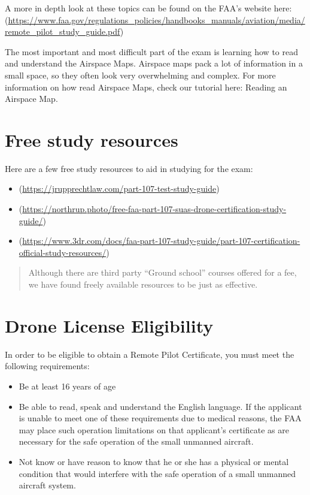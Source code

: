 \documentclass[
]{book}
\providecommand{\tightlist}{%
  \setlength{\itemsep}{0pt}\setlength{\parskip}{0pt}}
\begin{document}
A more in depth look at these topics can be found on the FAA's website here: (\url{https://www.faa.gov/regulations_policies/handbooks_manuals/aviation/media/remote_pilot_study_guide.pdf})

The most important and most difficult part of the exam is learning how to read and understand the Airspace Maps. Airspace maps pack a lot of information in a small space, so they often look very overwhelming and complex. For more information on how read Airspace Maps, check our tutorial here: Reading an Airspace Map.

\hypertarget{free-study-resources}{%
\section{Free study resources}\label{free-study-resources}}

Here are a few free study resources to aid in studying for the exam:

\begin{itemize}
\tightlist
\item
  (\url{https://jrupprechtlaw.com/part-107-test-study-guide})
\item
  (\url{https://northrup.photo/free-faa-part-107-suas-drone-certification-study-guide/})
\item
  (\url{https://www.3dr.com/docs/faa-part-107-study-guide/part-107-certification-official-study-resources/})
\end{itemize}

\begin{quote}
Although there are third party ``Ground school'' courses offered for a fee, we have found freely available resources to be just as effective.
\end{quote}

\hypertarget{drone-license-eligibility}{%
\section{Drone License Eligibility}\label{drone-license-eligibility}}

In order to be eligible to obtain a Remote Pilot Certificate, you must meet the following requirements:

\begin{itemize}
\tightlist
\item
  Be at least 16 years of age
\item
  Be able to read, speak and understand the English language. If the applicant is unable to meet one of these requirements due to medical reasons, the FAA may place such operation limitations on that applicant's certificate as are necessary for the safe operation of the small unmanned aircraft.
\item
  Not know or have reason to know that he or she has a physical or mental condition that would interfere with the safe operation of a small unmanned aircraft system.
\end{itemize}
\end{document}

